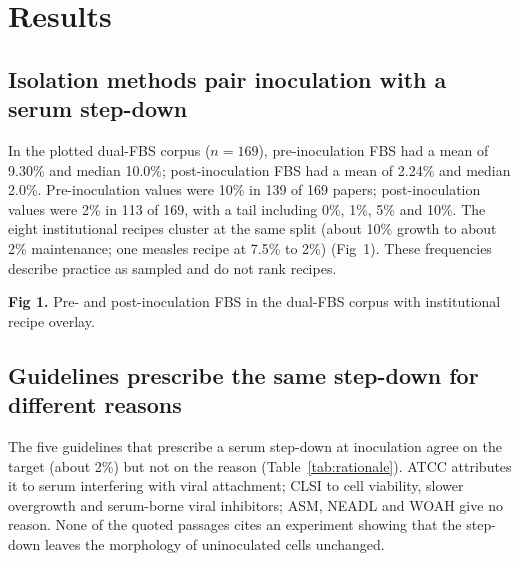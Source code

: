 \section*{Results}

\subsection*{Isolation methods pair inoculation with a serum step-down}
In the plotted dual-FBS corpus ($n=169$), pre-inoculation FBS had a mean of 9.30\% and median 10.0\%; post-inoculation FBS had a mean of 2.24\% and median 2.0\%. Pre-inoculation values were 10\% in 139 of 169 papers; post-inoculation values were 2\% in 113 of 169, with a tail including 0\%, 1\%, 5\% and 10\%. The eight institutional recipes cluster at the same split (about 10\% growth to about 2\% maintenance; one measles recipe at 7.5\% to 2\%) (Fig~1). These frequencies describe practice as sampled and do not rank recipes.


\textbf{Fig 1.} Pre- and post-inoculation FBS in the dual-FBS corpus with institutional recipe overlay.

\subsection*{Guidelines prescribe the same step-down for different reasons}
The five guidelines that prescribe a serum step-down at inoculation agree on the target (about 2\%) but not on the reason (Table~\ref{tab:rationale}). ATCC attributes it to serum interfering with viral attachment; CLSI to cell viability, slower overgrowth and serum-borne viral inhibitors; ASM, NEADL and WOAH give no reason. None of the quoted passages cites an experiment showing that the step-down leaves the morphology of uninoculated cells unchanged.



